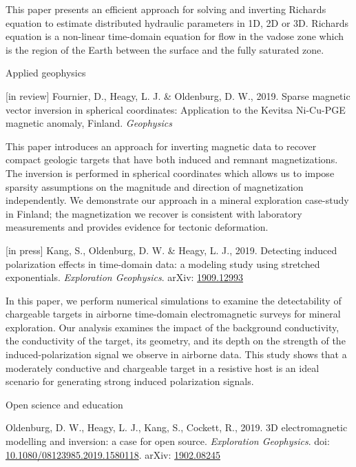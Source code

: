 \documentclass[a4paper, 11pt]{article}
\newcommand{\arxiv}[1]{arXiv: \href{https://arxiv.org/abs/#1}{#1}}
\newcommand{\doi}[1]{doi: \href{https://doi.org/#1}{#1}}
\newcommand{\subheading}[1]{
    \vspace{0.4cm}
    {\Large #1}\\
    \vspace{-0.2cm}
}
\begin{document}
This paper presents an efficient approach for solving and inverting Richards equation to estimate distributed hydraulic parameters in 1D, 2D or 3D. Richards equation is a non-linear time-domain equation for flow in the vadose zone which is the region of the Earth between the surface and the fully saturated zone.

\subheading{Applied geophysics}

\begin{myitemize}
    \item{[in review] Fournier, D., Heagy, L. J. \& Oldenburg, D. W., 2019. Sparse magnetic vector inversion in spherical coordinates: Application to the Kevitsa Ni-Cu-PGE magnetic anomaly, Finland. \emph{Geophysics}}
\end{myitemize}

This paper introduces an approach for inverting magnetic data to recover compact geologic targets that have both induced and remnant magnetizations. The inversion is performed in spherical coordinates which allows us to impose sparsity assumptions on the magnitude and direction of magnetization independently. We demonstrate our approach in a mineral exploration case-study in Finland; the magnetization we recover is consistent with laboratory measurements and provides evidence for tectonic deformation. \\

\begin{myitemize}
    \item{[in press] Kang, S., Oldenburg, D. W. \& Heagy, L. J., 2019. Detecting induced polarization effects in time-domain data: a modeling study using stretched exponentials. \emph{Exploration Geophysics}. \arxiv{1909.12993}}
\end{myitemize}

In this paper, we perform numerical simulations to examine the detectability of chargeable targets in airborne time-domain electromagnetic surveys for mineral exploration. Our analysis examines the impact of the background conductivity, the conductivity of the target, its geometry, and its depth on the strength of the induced-polarization signal we observe in airborne data. This study shows that a moderately conductive and chargeable target in a resistive host is an ideal scenario for generating strong induced polarization signals.

\subheading{Open science and education}

\begin{myitemize}
\item Oldenburg, D. W., Heagy, L. J., Kang, S., Cockett, R., 2019. 3D electromagnetic modelling and inversion: a case for open source. \emph{Exploration Geophysics}. \doi{10.1080/08123985.2019.1580118}. \arxiv{1902.08245}
\end{myitemize}
\end{document}
